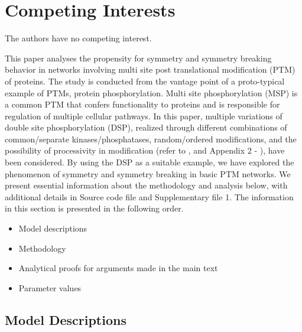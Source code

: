 \documentclass[9pt,lineno]{elife}
\begin{document}
\section{Competing Interests}

The authors have no competing interest. 

% 



\appendix
\begin{appendixbox}
This paper analyses the propensity for symmetry and symmetry breaking behavior in networks involving multi site post translational modification (PTM) of proteins. The study is conducted from the vantage point of a proto-typical example of PTMs, protein phosphorylation. Multi site phosphorylation (MSP) is a common PTM that confers functionality to proteins and is responsible for regulation of multiple cellular pathways. In this paper, multiple variations of double site phosphorylation (DSP), realized through different combinations of common/separate kinases/phosphatases, random/ordered modifications, and the possibility of processivity in modification (refer to ,  and Appendix 2 - ), have been considered. By using the DSP as a suitable example, we have explored the phenomenon of symmetry and symmetry breaking in basic PTM networks.
We present essential information about the methodology and analysis below, with additional details in Source code file and Supplementary file 1.
The information in this section is presented in the following order.

\begin{itemize}
    \item Model descriptions
    \item Methodology 
    \item Analytical proofs for arguments made in the main text
    \item Parameter values
\end{itemize}
    
\subsection*{Model Descriptions}


\end{appendixbox}
\end{document}
